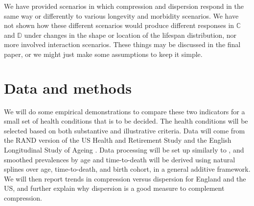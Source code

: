 \documentclass{article}
\begin{document}
We have provided scenarios in which compression and dispersion respond
in the same way or differently to various longevity and morbidity scenarios. We
have not shown how these different scenarios would produce different
responses in $\mathbb{C}$ and $\mathbb{D}$ under changes in the
shape or location of the lifespan distribution, nor more involved
interaction scenarios. These things may be discussed in the final paper, or we
might just make some assumptions to keep it simple.
\FloatBarrier
\section*{Data and methods}
We will do some empirical demonstrations to compare these two indicators for a
small set of health conditions that is to be decided. The health conditions will
be selected based on both substantive and illustrative criteria. Data will come
from the RAND version of the US Health and Retirement Study \citep{HRS} and
the English Longitudinal Study of Ageing \citep{steptoe2012cohort}. Data
processing will be set up similarly to \citet{riffe2015ttd}, and smoothed
prevalences by age and time-to-death will be derived using natural splines
over age, time-to-death, and birth cohort, in a general additive framework. We
will then report trends in compression versus dispersion for England and the US,
and further explain why dispersion is a good measure to complement compression.


    
\end{document}
